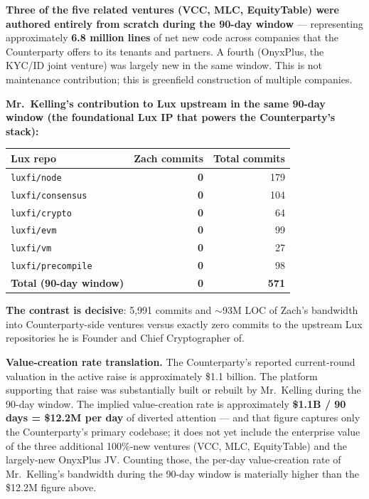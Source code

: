 \documentclass[11pt,letterpaper]{article}
\begin{document}
\textbf{Three of the five related ventures (VCC, MLC, EquityTable) were
authored entirely from scratch during the 90-day window} ---
representing approximately \textbf{6.8 million lines} of net new code
across companies that the Counterparty offers to its tenants and
partners. A fourth (OnyxPlus, the KYC/ID joint venture) was largely
new in the same window. This is not maintenance contribution; this
is greenfield construction of multiple companies.

\textbf{Mr.\ Kelling's contribution to Lux upstream in the same
90-day window (the foundational Lux IP that powers the
Counterparty's stack):}

\begin{center}
\begin{small}
\begin{tabular}{lrr}
\toprule
\textbf{Lux repo} & \textbf{Zach commits} & \textbf{Total commits} \\
\midrule
\texttt{luxfi/node}             & \textbf{0} & 179 \\
\texttt{luxfi/consensus}        & \textbf{0} & 104 \\
\texttt{luxfi/crypto}           & \textbf{0} & 64 \\
\texttt{luxfi/evm}              & \textbf{0} & 99 \\
\texttt{luxfi/vm}               & \textbf{0} & 27 \\
\texttt{luxfi/precompile}       & \textbf{0} & 98 \\
\midrule
\textbf{Total (90-day window)} & \textbf{0} & \textbf{571} \\
\bottomrule
\end{tabular}
\end{small}
\end{center}

\textbf{The contrast is decisive}: 5,991 commits and $\sim$93M LOC
of Zach's bandwidth into Counterparty-side ventures versus exactly
zero commits to the upstream Lux repositories he is Founder and
Chief Cryptographer of.

\textbf{Value-creation rate translation.} The Counterparty's reported
current-round valuation in the active raise is approximately \$1.1 billion. The platform supporting that raise was substantially
built or rebuilt by Mr.\ Kelling during the 90-day window. The
implied value-creation rate is approximately \textbf{\$1.1B / 90
days = \$12.2M per day} of diverted attention --- and that figure
captures only the Counterparty's primary codebase; it does not yet
include the enterprise value of the three additional 100\%-new
ventures (VCC, MLC, EquityTable) and the largely-new OnyxPlus JV.
Counting those, the per-day value-creation rate of Mr.\ Kelling's
bandwidth during the 90-day window is materially higher than the
\$12.2M figure above.
\end{document}
